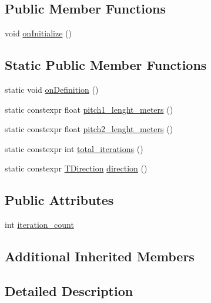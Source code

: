 \subsection*{Public Member Functions}
\begin{DoxyCompactItemize}
\item 
void \hyperlink{structsm__dance__bot_1_1SS5_1_1SsSPattern1_abcb191f06e2837ed59f40b5b93eccead}{on\+Initialize} ()
\end{DoxyCompactItemize}
\subsection*{Static Public Member Functions}
\begin{DoxyCompactItemize}
\item 
static void \hyperlink{structsm__dance__bot_1_1SS5_1_1SsSPattern1_a6731e46941d156b04d786bacaea13573}{on\+Definition} ()
\item 
static constexpr float \hyperlink{structsm__dance__bot_1_1SS5_1_1SsSPattern1_a32bf83535c603665005956c1a8cf71a7}{pitch1\+\_\+lenght\+\_\+meters} ()
\item 
static constexpr float \hyperlink{structsm__dance__bot_1_1SS5_1_1SsSPattern1_a5e923410f8aad0bdc57cf689e8cf1408}{pitch2\+\_\+lenght\+\_\+meters} ()
\item 
static constexpr int \hyperlink{structsm__dance__bot_1_1SS5_1_1SsSPattern1_a85e3580f9375fde963ea4204305ad27d}{total\+\_\+iterations} ()
\item 
static constexpr \hyperlink{namespacesm__dance__bot_1_1SS5_aaa01c87b9245bbff2b581cefd6f3b346}{T\+Direction} \hyperlink{structsm__dance__bot_1_1SS5_1_1SsSPattern1_abe6ab6e7e6630e67566c0fee58ce565f}{direction} ()
\end{DoxyCompactItemize}
\subsection*{Public Attributes}
\begin{DoxyCompactItemize}
\item 
int \hyperlink{structsm__dance__bot_1_1SS5_1_1SsSPattern1_ac1b4a50a642face1106fd58d026067ac}{iteration\+\_\+count}
\end{DoxyCompactItemize}
\subsection*{Additional Inherited Members}


\subsection{Detailed Description}


